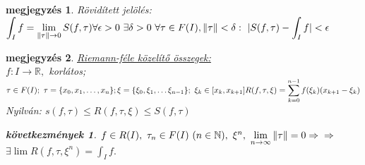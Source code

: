 \documentclass{article}
\newcommand{\fir}{f\colon I\rightarrow\mathbb{R}}
\newcommand{\N}{\mathbb{N}}
\newcommand{\n}{\rightarrow}
\newcommand{\nn}{\Rightarrow}
\newcommand{\di}{\displaystyle}
\theoremstyle{magyar}
\newtheorem{ko}{következmények}[section]
\newtheorem{me}{megjegyzés}[section]
\begin{document}
  \begin{me}
    Rövidített jelölés: $\di\int_{I}{f}=\di\lim_{\Vert\tau\Vert\n 0}{S(f,\tau)}\\
    \forall\epsilon>0\ \exists\delta>0\ \forall\tau\in F(I),\Vert\tau\Vert<\delta:\ \vert S(f,\tau)-\int_If\vert<\epsilon$
  \end{me}
  \begin{me}
    \underline{Riemann-féle közelítő összegek:}\\
    $\di\fir,$ korlátos; $\tau\in F(I);\ \tau=\{x_0,x_1,\ldots,x_n\};\\
    \xi=\{\xi_0,\xi_1,\ldots\xi_{n-1}\};\ \xi_k\in[x_k,x_{k+1}]\\
    R(f,\tau,\xi)=\di\sum_{k=0}^{n-1}{f(\xi_k)(x_{k+1}-\xi_k)}\\$
    Nyilván: $s(f,\tau)\le R(f,\tau,\xi)\le S(f,\tau)$
    \begin{ko}
      $f\in R(I),\ \tau_n\in F(I)\ (n\in\N),\ \xi^n,\ \di\lim_{n\n\infty}{\Vert\tau\Vert}=0\nn\\\nn$
      $\exists\lim{R(f,\tau,\xi^n)}=\di\int_If.$ 
    \end{ko}
  \end{me}
  \newpage
\end{document}
